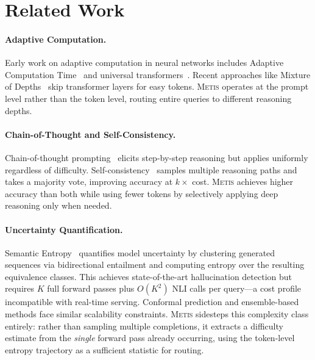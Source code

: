 \documentclass[11pt,a4paper]{article}
\newcommand{\metis}{\textsc{Metis}}
\begin{document}
\section{Related Work}
\label{sec:related}

\paragraph{Adaptive Computation.}
Early work on adaptive computation in neural networks includes Adaptive Computation Time~\citep{graves2016adaptive} and universal transformers~\citep{dehghani2018universal}. Recent approaches like Mixture of Depths~\citep{raposo2024mixture} skip transformer layers for easy tokens. \metis{} operates at the prompt level rather than the token level, routing entire queries to different reasoning depths.

\paragraph{Chain-of-Thought and Self-Consistency.}
Chain-of-thought prompting~\citep{wei2022chain} elicits step-by-step reasoning but applies uniformly regardless of difficulty. Self-consistency~\citep{wang2022self} samples multiple reasoning paths and takes a majority vote, improving accuracy at $k\times$ cost. \metis{} achieves higher accuracy than both while using fewer tokens by selectively applying deep reasoning only when needed.

\paragraph{Uncertainty Quantification.}
Semantic Entropy~\citep{kuhn2023semantic} quantifies model uncertainty by clustering generated sequences via bidirectional entailment and computing entropy over the resulting equivalence classes. This achieves state-of-the-art hallucination detection but requires $K$ full forward passes plus $O(K^2)$ NLI calls per query---a cost profile incompatible with real-time serving. Conformal prediction and ensemble-based methods face similar scalability constraints. \metis{} sidesteps this complexity class entirely: rather than sampling multiple completions, it extracts a difficulty estimate from the \emph{single} forward pass already occurring, using the token-level entropy trajectory as a sufficient statistic for routing.
\end{document}
